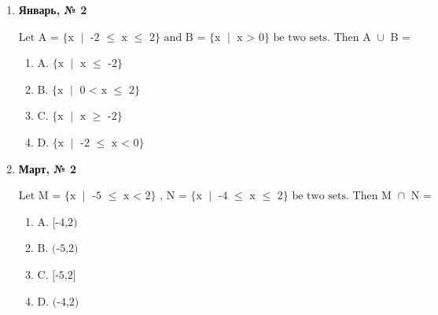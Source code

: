 \begin{enumerate}
$\displaystyle \text{If the set A = (-1, 3) and B = [2, 4], then what is A }\cap\text{  B?}$
\begin{enumerate}
\item $\displaystyle \text{A. [2, 3]}$
\item $\displaystyle \text{B. [2, 3)}$
\item $\displaystyle \text{C. (2, 3]}$
\item $\displaystyle \text{D. (2, 3)}$
\end{enumerate}
\item \textbf{Январь, № 2} \par \smallskip
$\displaystyle \text{Let A = }\{\text{x }\mid\text{ -2 }\leq\text{  x }\leq\text{  2}\}\text{ and B = }\{\text{x }\mid\text{ x > 0}\}\text{ be two sets. Then A }\cup\text{  B =}$
\begin{enumerate}
\item $\displaystyle \text{A. }\{\text{x }\mid\text{ x }\leq\text{  -2}\}$
\item $\displaystyle \text{B. }\{\text{x }\mid\text{ 0 < x }\leq\text{  2}\}$
\item $\displaystyle \text{C. }\{\text{x }\mid\text{ x }\geq\text{  -2}\}$
\item $\displaystyle \text{D. }\{\text{x }\mid\text{ -2 }\leq\text{  x < 0}\}$
\end{enumerate}
\item \textbf{Март, № 2} \par \smallskip
$\displaystyle \text{Let M = }\{\text{x }\mid\text{ -5 }\leq\text{  x < 2}\}\text{ , N = }\{\text{x }\mid\text{ -4 }\leq\text{  x }\leq\text{  2}\}\text{ be two sets. Then M }\cap\text{  N =}$
\begin{enumerate}
\item $\displaystyle \text{A. [-4,2)}$
\item $\displaystyle \text{B. (-5,2)}$
\item $\displaystyle \text{C. [-5,2]}$
\item $\displaystyle \text{D. (-4,2)}$
\end{enumerate}
\end{enumerate}

